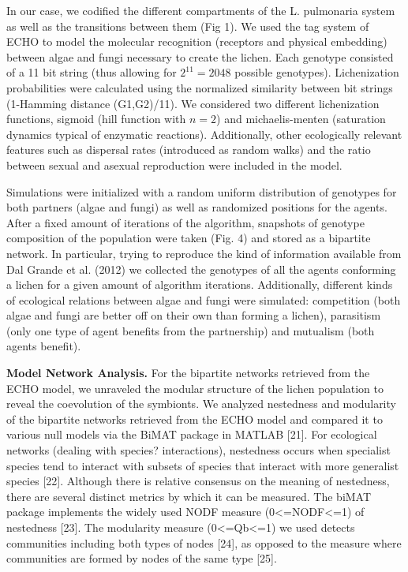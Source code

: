 \documentclass[runningheads,a4paper]{llncs}
\begin{document}
 In our case, we codified the different compartments of the L. pulmonaria system as well as the transitions between them (Fig 1). We used the tag system of ECHO to model the molecular recognition (receptors and physical embedding) between algae and fungi necessary to create the lichen. Each genotype consisted of a 11 bit string (thus allowing for $2^11=2048$ possible genotypes). Lichenization probabilities were calculated using the normalized similarity between bit strings (1-Hamming distance (G1,G2)/11). We considered two different lichenization functions, sigmoid (hill function with $n=2$) and michaelis-menten (saturation dynamics typical of enzymatic reactions). Additionally, other ecologically relevant features such as dispersal rates (introduced as random walks) and the ratio between sexual and asexual reproduction were included in the model. 
 
Simulations were initialized with a random uniform distribution of genotypes for both partners (algae and fungi) as well as randomized positions for the agents. After a fixed amount of iterations of the algorithm, snapshots of genotype composition of the population were taken (Fig. 4) and stored as a bipartite network. In particular, trying to reproduce the kind of information available from Dal Grande et al. (2012) we collected the genotypes of all the agents conforming a lichen for a given amount of algorithm iterations. Additionally, different kinds of ecological relations between algae and fungi were simulated: competition (both algae and fungi are better off on their own than forming a lichen), parasitism (only one type of agent benefits from the partnership) and mutualism (both agents benefit).

\textbf{Model Network Analysis.} 
For the bipartite networks retrieved from the ECHO model, we unraveled the modular structure of the lichen population to reveal the coevolution of the symbionts. We analyzed nestedness and modularity of the bipartite networks retrieved from the ECHO model and compared it to various null models via the BiMAT package in MATLAB [21]. For ecological networks (dealing with species? interactions), nestedness occurs when specialist species tend to interact with subsets of species that interact with more generalist species [22]. Although there is relative consensus on the meaning of nestedness, there are several distinct metrics by which it can be measured. The biMAT package implements the widely used NODF measure (0<=NODF<=1) of nestedness [23]. The modularity measure (0<=Qb<=1) we used detects communities including both types of nodes [24], as opposed to the measure where communities are formed by nodes of the same type [25]. 
\end{document}
